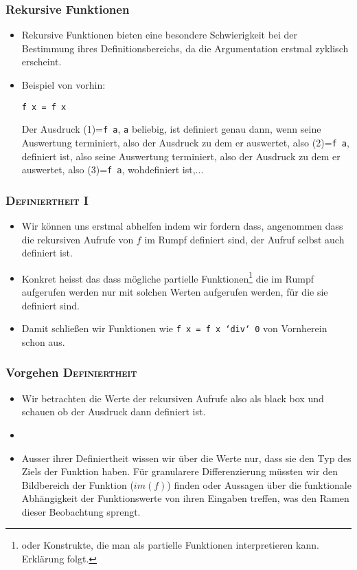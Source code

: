 \documentclass{beamer}
\begin{document}
\begin{frame}[fragile]
  \frametitle{Rekursive Funktionen}
  \begin{itemize}
  \item Rekursive Funktionen bieten eine besondere Schwierigkeit bei der Bestimmung ihres Definitionsbereichs, da die Argumentation erstmal zyklisch erscheint. 
  \item Beispiel von vorhin:
\begin{Verbatim}
f x = f x
\end{Verbatim}
    Der Ausdruck (1)=\texttt{f a}, \texttt{a} beliebig, ist definiert genau dann, wenn seine Auswertung terminiert, also der Ausdruck zu dem er auswertet, also (2)=\texttt{f a}, definiert ist, also seine Auswertung terminiert, also der Ausdruck zu dem er auswertet, also (3)=\texttt{f a}, wohdefiniert ist,...
  \end{itemize}
\end{frame}

\begin{frame}
  \frametitle{\textsc{Definiertheit I}}
  \begin{itemize}
  \item Wir können uns erstmal abhelfen indem wir fordern dass, angenommen dass die rekursiven Aufrufe von \(f\) im Rumpf definiert sind, der Aufruf selbst auch definiert ist.
  \item Konkret heisst das dass mögliche partielle Funktionen\footnote{oder Konstrukte, die man als partielle Funktionen interpretieren kann. Erklärung folgt.} die im Rumpf aufgerufen werden nur mit solchen Werten aufgerufen werden, für die sie definiert sind.
  \item Damit schließen wir Funktionen wie \texttt{f x = f x `div` 0} von Vornherein schon aus.
  \end{itemize}
\end{frame}
\begin{frame}
  \frametitle{Vorgehen \textsc{Definiertheit}}
  \begin{itemize}
  \item Wir betrachten die Werte der rekursiven Aufrufe also als black box und schauen ob der Ausdruck dann definiert ist.
  \item {}
  \item<3-> Ausser ihrer Definiertheit wissen wir über die Werte nur, dass sie den Typ des Ziels der Funktion haben. Für granularere Differenzierung müssten wir den Bildbereich der Funktion (\(im(f)\)) finden oder Aussagen über die funktionale Abhängigkeit der Funktionswerte von ihren Eingaben treffen, was den Ramen dieser Beobachtung sprengt.
  \end{itemize}
\end{frame}
\end{document}
